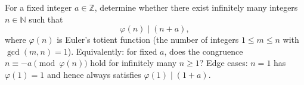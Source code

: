 For a fixed integer $a\in\mathbb{Z}$, determine whether there exist infinitely many integers $n\in\mathbb{N}$ such that
\[
\varphi(n)\mid (n+a),
\]
where $\varphi(n)$ is Euler's totient function (the number of integers $1\leq m\leq n$ with $\gcd(m,n)=1$).
Equivalently: for fixed $a$, does the congruence $n\equiv -a\pmod{\varphi(n)}$ hold for infinitely many $n\ge1$?
Edge cases: $n=1$ has $\varphi(1)=1$ and hence always satisfies $\varphi(1)\mid (1+a)$.
